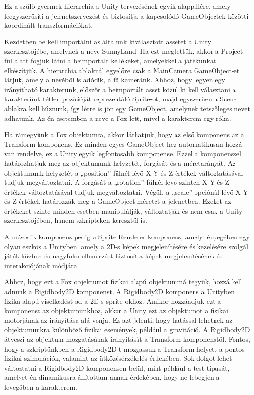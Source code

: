 Ez a szülő-gyermek hierarchia a Unity tervezésének egyik alappillére, amely leegyszerűsíti a jelenetszervezést és biztosítja a kapcsolódó GameObjectek közötti koordinált transzformációkat.


Kezdetben be kell importálni az általunk kiválasztott assetet\cite{unityasset1} a Unity szerkesztőjébe, amelynek a neve SunnyLand. Ha ezt megtettük, akkor a Project fül alatt fogjuk látni a beimportált kellékeket, amelyekkel a játékunkat elkészítjük. A hierarchia ablaknál egyelőre csak a MainCamera GameObject-et látjuk, amely a nevéből is adódik, a fő kameránk. Ahhoz, hogy legyen egy irányítható karakterünk, előszőr a beimportált asset közül ki kell választani a karakterünk tétlen pozícióját reprezentáló Sprite-ot, majd egyszerűen a Scene ablakra kell húznunk, így létre is jön egy GameObject, amelynek tetszőleges nevet adhatunk. Az én esetemben a neve a Fox lett, mivel a karakterem egy róka.

Ha rámegyünk a Fox objektumra, akkor láthatjuk, hogy az első komponens az a Transform komponens. Ez minden egyes GameObject-hez automatikusan hozzá van rendelve, ez a Unity egyik legfontosabb komponense. Ezzel a komponenssel határozhatjuk meg az objektumunk helyzetét, forgását és a méretarányát. 
Az objektumunk helyzetét a „position” fülnél lévő X Y és Z értékek változtatásával tudjuk megváltoztatni. A forgását a „rotation” fülnél levő szintén X Y és Z értékek változtatásával tudjuk megváltoztatni. Végül, a „scale” opciónál lévő X Y és Z értékek határozzák meg a GameObject méretét a jelenetben. 
Ezeket az értékeket szinte minden esetben manipulálják, változtatják és nem csak a Unity szerkesztőjében, hanem szkripteken keresztül is. \cite{transformcomponent}

A második komponens pedig a Sprite Renderer komponens, amely lényegében egy olyan eszköz a Unityben, amely a 2D-s képek megjelenítésére és kezelésére szolgál játék közben és nagyfokú ellenőrzést biztosít a képek megjelenítésének és interakciójának módjára. 

Ahhoz, hogy ezt a Fox objektumot fizikai alapú objektummá tegyük, hozzá kell adnunk a Rigidbody2D komponenst. A Rigidbody2D komponens a Unityben fizika alapú viselkedést ad a 2D-s sprite-okhoz. Amikor hozzáadjuk ezt a komponenst az objektumunkhoz, akkor a Unity ezt az objektumot a fizikai motorjának az irányítása alá vonja. Ez azt jelenti, hogy hatással lehetnek az objektumunkra különböző fizikai események, például a gravitáció. A Rigidbody2D átveszi az objektum mozgatásának irányítását a Transform komponenstől. Fontos, hogy a szkriptünkben a Rigidbody2D-t mozgassuk a Transform helyett a pontos fizikai szimulációk, valamint az ütközésérzékelés érdekében. Sok dolgot lehet változtatni a Rigidbody2D komponensen belül, mint például a test típusát, amelyet én dinamikusra állítottam annak érdekében, hogy ne lebegjen a levegőben a karakterem. \cite{unityrigidbody2d}

